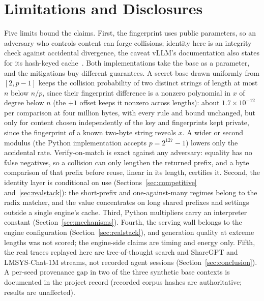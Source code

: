 \documentclass[10pt,conference]{IEEEtran}
\begin{document}
\section{Limitations and Disclosures}\label{sec:limits}

Five limits bound the claims. First, the fingerprint uses public
parameters, so an adversary who controls content can forge collisions;
identity here is an integrity check against accidental divergence, the
caveat vLLM's documentation also states for its hash-keyed
cache~\cite{vllm2025apc}. Both implementations take the base as a
parameter, and the mitigations buy different guarantees. A secret base
drawn uniformly from $[2, p-1]$ keeps the collision probability of two
distinct strings of length at most $n$ below $n/p$, since their
fingerprint difference is a nonzero polynomial in $x$ of degree below
$n$ (the $+1$ offset keeps it nonzero across lengths): about
$1.7 \times 10^{-12}$ per comparison at four million bytes, with every
rule and bound unchanged, but only for content chosen independently of
the key and fingerprints kept private, since the fingerprint of a known
two-byte string reveals $x$. A wider or second modulus (the Python
implementation accepts $p = 2^{127}-1$) lowers only the accidental
rate. Verify-on-match is exact against any adversary: equality has no
false negatives, so a collision can only lengthen the returned prefix,
and a byte comparison of that prefix before reuse, linear in its
length, certifies it. Second, the identity layer is conditional on use
(Sections~\ref{sec:competitive} and~\ref{sec:realstack}): the
short-prefix and one-against-many regimes belong to the radix matcher,
and the value concentrates on long shared prefixes and settings outside
a single engine's cache. Third, Python multipliers carry an interpreter
constant (Section~\ref{sec:mechanisms}). Fourth, the serving wall belongs to
the engine configuration (Section~\ref{sec:realstack}), and generation
quality at extreme lengths was not scored; the engine-side claims are
timing and energy only. Fifth, the real traces replayed here are tree-of-thought search
and ShareGPT and LMSYS-Chat-1M streams, not recorded agent sessions
(Section~\ref{sec:conclusion}). A per-seed provenance gap in two of the
three synthetic base contexts is documented in the project record
(recorded corpus hashes are authoritative; results are unaffected).

\end{document}
